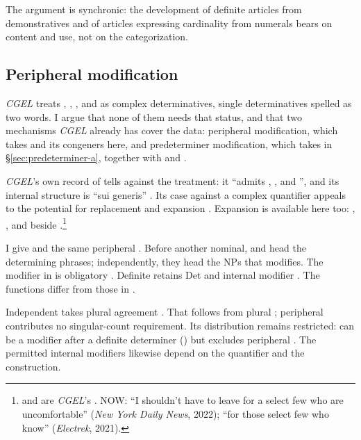 \documentclass[12pt]{article}
\begin{document}
The argument is synchronic: the development of definite articles from demonstratives and of articles expressing cardinality from numerals \citep[331--336]{lyons1999} bears on content and use, not on the categorization.

\subsection{Peripheral modification}\label{sec:complex-determinatives}
\textit{CGEL} treats , , , and  as complex determinatives, single determinatives spelled as two words. I argue that none of them needs that status, and that two mechanisms \textit{CGEL} already has cover the data: peripheral modification, which takes  and its congeners here, and predeterminer modification, which takes  in §\ref{sec:predeterminer-a}, together with  and .

\textit{CGEL}'s own record of  tells against the treatment: it \enquote{admits , , and }, and its internal structure is \enquote{sui generis} \citep[392, 394]{huddleston2002}. Its case against a complex quantifier  appeals to the potential for replacement and expansion \citep[351--352]{huddleston2002}. Expansion is available here too: , , and  beside .\footnote{ and  are \textit{CGEL}'s \citep[392]{huddleston2002}. NOW: \enquote{I shouldn't have to leave for a select few who are uncomfortable} (\textit{New York Daily News}, 2022); \enquote{for those select few who know} (\textit{Electrek}, 2021).}

I give  and  the same peripheral . Before another nominal,  and  head the determining phrases; independently, they head the NPs that  modifies. The modifier in  is obligatory \citep[394]{huddleston2002}. Definite  retains Det  and internal modifier  \citep[392]{huddleston2002}. The functions differ from those in .

Independent  takes plural agreement \citep[392]{huddleston2002}. That follows from plural ; peripheral  contributes no singular-count requirement. Its distribution remains restricted:  can be a modifier after a definite determiner () \citep[392]{huddleston2002} but excludes peripheral . The permitted internal modifiers likewise depend on the quantifier and the construction.
\end{document}
